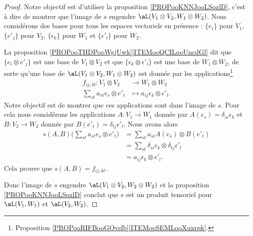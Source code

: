 \begin{proof}
	Notre objectif est d'utiliser la proposition \ref{PROPooKNNJooLSqzlD}, c'est à dire de montrer que l'image de \( s\) engendre \( \aL(V_1\otimes V_2,W_1\otimes W_2)\). Nous considérons des bases pour tous les espaces vectoriels en présence : \( \{ e_i \}\) pour \( V_1\), \( \{ e'_j \}\) pour \( V_2\), \( \{ \epsilon_k \}\) pour \( W_1\) et \( \{ \epsilon'_l \}\) pour \( W_2\).

	La proposition \ref{PROPooTHDPooWgjUwk}\ref{ITEMooQCILooUncdGl} dit que \( \{ e_i\otimes e'_j \}\) est une base de \( V_1\otimes V_2\) et que \( \{ \epsilon_k\otimes \epsilon'_l \}\) est une base de \( W_1\otimes W_2\), de sorte qu'une base de \( \aL(V_1\otimes V_2,W_1\otimes W_2)\) est donnée par les applications\footnote{Proposition \ref{PROPooRIFBooGOvsfb}\ref{ITEMooSEMLooXuxrpk}.}
	\begin{equation}
		\begin{aligned}
			f_{ij,kl}\colon V_1\otimes V_2 & \to W_1\otimes W_2                             \\
			\sum_{st}a_{st}e_s\otimes e'_t & \mapsto a_{ij}  \epsilon_k\otimes \epsilon'_l.
		\end{aligned}
	\end{equation}
	Notre objectif est de montrer que ces applications sont dans l'image de \( s\). Pour cela nous considérons les applications \(A \colon V_1\to W_1  \) donnée par \( A(e_s)=\delta_{si}\epsilon_k\) et \(B \colon V_2\to W_2  \) donnée par \( B(e'_t)=\delta_{tj}\epsilon'_l\). Nous avons alors
	\begin{subequations}
		\begin{align}
			s(A,B)\big( \sum_{st}a_{st}e_s\otimes e'_t \big) & =\sum_{st}a_{st}A(e_s)\otimes B(e'_t)                         \\
			                                                 & =\sum_{st}\delta_{si}\epsilon_k\otimes \delta_{tj}\epsilon'_l \\
			                                                 & =a_{ij} \epsilon_k\otimes \epsilon'_l.
		\end{align}
	\end{subequations}
	Cela prouve que \( s(A,B)=f_{ij,kl}\).

	Donc l'image de \( s\) engendre \( \aL(V_1\otimes V_2,W_2\otimes W_2)\) et la proposition \ref{PROPooKNNJooLSqzlD} conclut que \( s\) est un produit tensoriel pour \(\aL(V_1,W_1)\) et \( \aL(V_2,W_2)\).
\end{proof}


